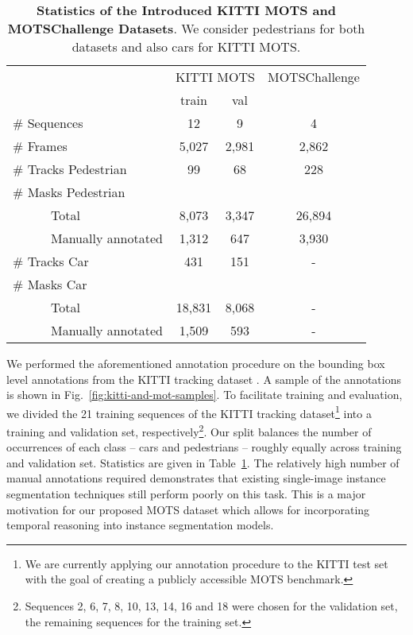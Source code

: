 \documentclass[10pt,twocolumn,letterpaper]{article}
\newcommand{\PAR}[1]{\vskip1pt \noindent {\bf #1~}}
\begin{document}
\begin{table}
\small
\setlength{\tabcolsep}{3.5pt}
\centering{}\begin{tabular}{lccc}
\toprule 
 & \multicolumn{2}{c}{{\footnotesize{}KITTI MOTS}} & \multicolumn{1}{c}{{\footnotesize{}MOTSChallenge}}\tabularnewline
 & {\footnotesize{}train } & {\footnotesize{}val } & \tabularnewline
\midrule 
{\footnotesize{}\# Sequences } & {\footnotesize{}12 } & {\footnotesize{}9 } & {\footnotesize{}4}\tabularnewline
{\footnotesize{}\# Frames } & {\footnotesize{}5,027 } & {\footnotesize{}2,981 } & {\footnotesize{}2,862}\tabularnewline
\midrule 
{\footnotesize{}\# Tracks Pedestrian } & {\footnotesize{}99 } & {\footnotesize{}68 } & {\footnotesize{}228 }\tabularnewline
{\footnotesize{}\# Masks Pedestrian } &  &  & \tabularnewline
{\footnotesize{}\ \ \ \ \ \  Total } & {\footnotesize{}8,073 } & {\footnotesize{}3,347 } & {\footnotesize{}26,894 }\tabularnewline
{\footnotesize{}\ \ \ \ \ \  Manually annotated } & {\footnotesize{}1,312 } & {\footnotesize{}647 } & {\footnotesize{}3,930 }\tabularnewline
\midrule 
{\footnotesize{}\# Tracks Car } & {\footnotesize{}431 } & {\footnotesize{}151 } & {\footnotesize{}-}\tabularnewline
{\footnotesize{}\# Masks Car } &  &  & \tabularnewline
{\footnotesize{}\ \ \ \ \ \  Total } & {\footnotesize{}18,831 } & {\footnotesize{}8,068 } & {\footnotesize{}-}\tabularnewline
{\footnotesize{}\ \ \ \ \ \  Manually annotated } & {\footnotesize{}1,509 } & {\footnotesize{}593 } & {\footnotesize{}-}\tabularnewline
\bottomrule
\end{tabular}\caption{\label{tab:dataset-stats}\textbf{Statistics of the Introduced KITTI MOTS and MOTSChallenge
Datasets}. We consider pedestrians for both datasets and also cars for KITTI MOTS.}
\end{table}


\PAR{KITTI MOTS.}
We performed the aforementioned annotation procedure on the bounding box level annotations from the KITTI tracking dataset \cite{Geiger12CVPR}. A sample of the annotations is shown in Fig.~\ref{fig:kitti-and-mot-samples}.
To facilitate training and evaluation, we divided the 21 training sequences of the KITTI tracking dataset\footnote{We are currently applying our annotation procedure to the KITTI test set with the goal of creating a publicly accessible MOTS benchmark.} into a training and validation set, respectively\footnote{Sequences 2, 6, 7, 8, 10, 13, 14, 16 and 18 were chosen for the validation set, the remaining sequences for the training set.}. Our split balances the number of occurrences of each class -- cars and pedestrians -- roughly equally across training and validation set. Statistics are given in Table~\ref{tab:dataset-stats}. The relatively high number of manual annotations required demonstrates that existing single-image instance segmentation techniques still perform poorly on this task. This is a major motivation for our proposed MOTS dataset which allows for incorporating temporal reasoning into instance segmentation models.
\end{document}
